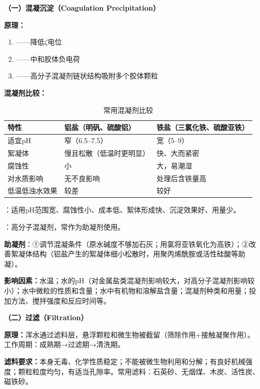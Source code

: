 \documentclass[10pt,a4paper,oneside]{ctexbook}
\begin{document}
\begin{keybox}
\textbf{（一）混凝沉淀（Coagulation Precipitation）}

\textbf{原理：}
\begin{enumerate}[leftmargin=*]
    \item {}——降低$\zeta$电位
    \item {}——中和胶体负电荷
    \item {}——高分子混凝剂链状结构吸附多个胶体颗粒
\end{enumerate}

\textbf{混凝剂比较：}

\begin{table}[H]
\centering
\caption{常用混凝剂比较}
\begin{tabularx}{\textwidth}{lXX}
\hline
\textbf{特性} & \textbf{铝盐（明矾、硫酸铝）} & \textbf{铁盐（三氯化铁、硫酸亚铁）} \\
\hline
适宜pH & 窄（6.5--7.5） & 宽（5--9） \\
絮凝体 & 慢且松散（低温时更明显） & 快、大而紧密 \\
腐蚀性 & 小 & 大，易潮湿 \\
对水质影响 & 无不良影响 & 处理后含铁量高 \\
低温低浊水效果 & 较差 & 较好 \\
\hline
\end{tabularx}
\end{table}

：适用pH范围宽、腐蚀性小、成本低、絮体形成快、沉淀效果好、用量少。

：高分子混凝剂，常作为助凝剂使用。

\textbf{助凝剂}：①调节混凝条件（原水碱度不够加石灰；用氯将亚铁氧化为高铁）；②改善絮凝体结构（铝盐产生的絮凝体细小松散时，用聚丙烯酰胺或活性硅酸等助凝）。

\textbf{影响因素：}水温；水的pH（对金属盐类混凝剂影响较大，对高分子混凝剂影响较小）；水中微粒的性质和含量；水中有机物和溶解盐含量；混凝剂种类和用量；投加方法、搅拌强度和反应时间等。

\textbf{（二）过滤（Filtration）}

\textbf{原理：}浑水通过滤料层，悬浮颗粒和微生物被截留（筛除作用+接触凝聚作用）。工作周期：成熟期→过滤期→清洗期。

\textbf{滤料要求：}本身无毒、化学性质稳定；不能被微生物利用和分解；有良好机械强度；颗粒粒度均匀，有适当孔隙率。常用滤料：石英砂、无烟煤、木炭、活性炭、磁铁砂。


\end{keybox}
\end{document}

